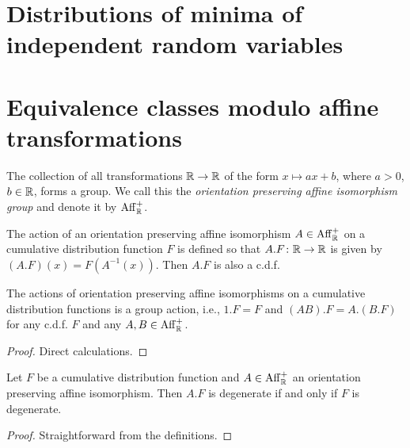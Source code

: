 \section{Distributions of minima of independent random variables}

\section{Equivalence classes modulo affine transformations}

\begin{definition}
  \label{def:oriented-affine-isomorphism}
  The collection of all transformations $\mathbb{R} \to \mathbb{R}$ of the form
  $x \mapsto a x + b$, where $a>0$, $b \in \mathbb{R}$, forms a group.
  We call this the \emph{orientation preserving affine isomorphism group}
  and denote it by $\mathrm{Aff}^+_{\mathbb{R}}$.
\end{definition}

\begin{definition}
  \label{def:oriented-affine-transform-of-cdf}
  The action of an orientation preserving affine isomorphism $A \in \mathrm{Aff}^+_{\mathbb{R}}$
  on a cumulative distribution function $F$ is defined so
  that $A.F \colon \mathbb{R} \to \mathbb{R}$ is given by $(A.F)(x) = F(A^{-1}(x))$.
  Then $A.F$ is also a c.d.f.
\end{definition}

\begin{lemma}
  \label{lem:oriented-affine-action-on-cdf}
  The actions of orientation preserving affine isomorphisms
  on a cumulative distribution functions is a group action, i.e.,
  $1.F = F$ and $(AB).F = A.(B.F)$ for any c.d.f. $F$ and any $A,B \in \mathrm{Aff}^+_{\mathbb{R}}$.
\end{lemma}
\begin{proof}
  \uses{}
  Direct calculations.
\end{proof}

\begin{lemma}
  \label{lem:degenerate-cdf-transform}
  Let $F$ be a cumulative distribution function
  and $A \in \mathrm{Aff}^+_{\mathbb{R}}$ an orientation preserving affine isomorphism.
  Then $A.F$ is degenerate if and only if $F$ is degenerate.
\end{lemma}
\begin{proof}
  \uses{}
  Straightforward from the definitions.
\end{proof}

